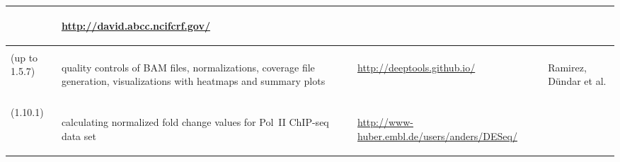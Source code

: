 \begin{singlespacing}
\begin{small}
\begin{longtable}{>{\textsf\bgroup\raggedleft\arraybackslash}p{2.7cm}<{\egroup} >{\textsf\bgroup}p{4.5cm}<{\egroup} >{\textsf\bgroup}p{4.2cm}<{\egroup}>{\textsf\bgroup}p{2.3cm}<{\egroup}}
\begin{minipage}{4.5cm}
			\end{minipage} 
			&  \begin{minipage}{4.2cm}
				\url{http://david.abcc.ncifcrf.gov/}
			\end{minipage} 
				&  \begin{minipage}{2.3cm}
				\citet{Huang2009}
			\end{minipage} 
\tabularnewline \midrule
 \begin{minipage}{2.7cm}
					\textbf{deepTools} \\
					(up to 1.5.7) %
			\end{minipage} 
			&  \begin{minipage}{4.5cm}
				quality controls of BAM files, normalizations, coverage file generation, visualizations with heatmaps and summary plots %
			\end{minipage} 
			&  \begin{minipage}{4.2cm}
				\url{http://deeptools.github.io/} %
			\end{minipage} 
				&  \begin{minipage}{2.3cm}
		\raggedright Ramirez, Dündar et al. \citep{Ramirez2014} %
			\end{minipage} 
\tabularnewline \midrule
 \begin{minipage}{2.7cm}
					\textbf{DESeq}\\
					(1.10.1)
				\end{minipage} 
			&  \begin{minipage}{4.5cm}
				calculating normalized fold change values for Pol~II ChIP-seq data set \citep{EBIroutine}
			\end{minipage} 	
			&  \begin{minipage}{4.2cm}
				\url{http://www-huber.embl.de/users/anders/DESeq/}
			\end{minipage}
				& 
				\begin{minipage}{2.3cm}
		\citet{Anders2010}
			\end{minipage} 
\tabularnewline \midrule

\end{longtable}
\end{small}
\end{singlespacing}
